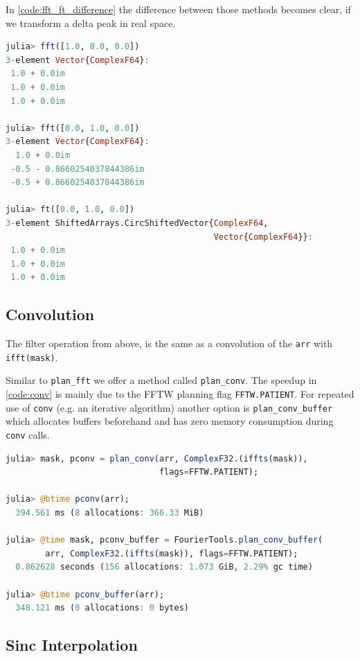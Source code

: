 \documentclass{juliacon}
\def\lc{\lstinline}
\begin{document}
In \autoref{code:fft_ft_difference} the difference between those methods becomes clear,
if we transform a delta peak in real space.
\begin{lstlisting}[language=Julia, label={code:fft_ft_difference}, caption={Difference between \lc{fft} and \lc{ft}.}, captionpos=b]
julia> fft([1.0, 0.0, 0.0])
3-element Vector{ComplexF64}:
 1.0 + 0.0im
 1.0 + 0.0im
 1.0 + 0.0im

julia> fft([0.0, 1.0, 0.0])
3-element Vector{ComplexF64}:
  1.0 + 0.0im
 -0.5 - 0.8660254037844386im
 -0.5 + 0.8660254037844386im

julia> ft([0.0, 1.0, 0.0])
3-element ShiftedArrays.CircShiftedVector{ComplexF64, 
                                          Vector{ComplexF64}}:
 1.0 + 0.0im
 1.0 + 0.0im
 1.0 + 0.0im
\end{lstlisting}

    \subsection{Convolution}
        The filter operation from above, is the same as a convolution of the \lc{arr} with \lc{ifft(mask)}.

        Similar to \lc{plan_fft} we offer a method called \lc{plan_conv}.
        The speedup in \autoref{code:conv} is mainly due to the FFTW planning flag \lc{FFTW.PATIENT}.
        For repeated use of \lc{conv} (e.g. an iterative algorithm) another option is
        \lc{plan_conv_buffer} which allocates buffers beforehand and has zero
        memory consumption during \lc{conv} calls.
\begin{lstlisting}[language=Julia, captionpos=b, caption={Convolution planning. One with memory allocations, the other without.}, label=code:conv]
julia> mask, pconv = plan_conv(arr, ComplexF32.(iffts(mask)), 
                               flags=FFTW.PATIENT);

julia> @btime pconv(arr);
  394.561 ms (8 allocations: 366.33 MiB)
  
julia> @time mask, pconv_buffer = FourierTools.plan_conv_buffer(
        arr, ComplexF32.(iffts(mask)), flags=FFTW.PATIENT);
  0.862628 seconds (156 allocations: 1.073 GiB, 2.29% gc time)

julia> @btime pconv_buffer(arr);
  348.121 ms (0 allocations: 0 bytes)
\end{lstlisting}    
        
    \subsection{Sinc Interpolation}
        
\end{document}
